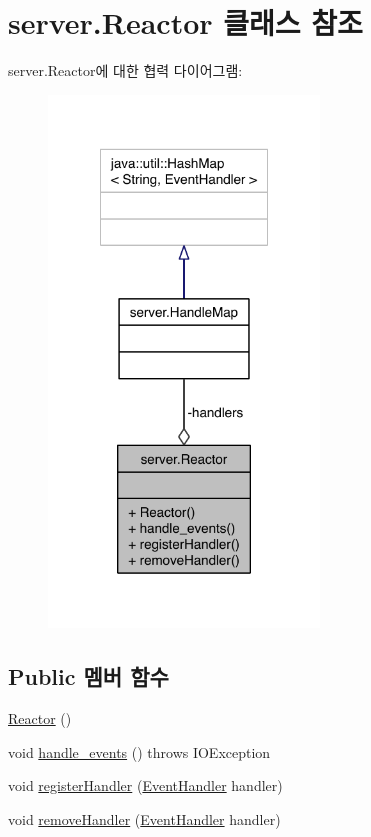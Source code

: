 \hypertarget{classserver_1_1_reactor}{\section{server.\-Reactor 클래스 참조}
\label{classserver_1_1_reactor}
}


server.\-Reactor에 대한 협력 다이어그램\-:
\nopagebreak
\begin{figure}[H]
\begin{center}
\leavevmode
\includegraphics[width=204pt]{classserver_1_1_reactor__coll__graph}
\end{center}
\end{figure}
\subsection*{Public 멤버 함수}
\begin{DoxyCompactItemize}
\item 
\hyperlink{classserver_1_1_reactor_ad32bfcaec7e42dfd6aab98c462af98cf}{Reactor} ()
\item 
void \hyperlink{classserver_1_1_reactor_a6049200905b17b4aba0de79b6df0f5d2}{handle\-\_\-events} ()  throws I\-O\-Exception 
\item 
void \hyperlink{classserver_1_1_reactor_a3e668edae20fadfc4063a83a74001fda}{register\-Handler} (\hyperlink{classserver_1_1event__handler_1_1_event_handler}{Event\-Handler} handler)
\item 
void \hyperlink{classserver_1_1_reactor_a936c855c6581047687a117c0ee76a296}{remove\-Handler} (\hyperlink{classserver_1_1event__handler_1_1_event_handler}{Event\-Handler} handler)
\end{DoxyCompactItemize}
